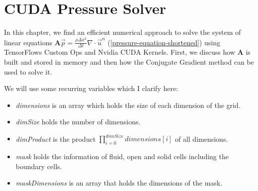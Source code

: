 \chapter{CUDA Pressure Solver}\label{chapter:cudapressuresolver}
In this chapter, we find an efficient numerical approach to solve the system of linear equations $\mathbf{A}\vec{p} = \frac{\rho \Delta x^2}{\Delta t}\nabla \cdot \vec{u}^n$ (\ref{pressure-equation-shortened}) using TensorFlows Custom Ops and Nvidia CUDA Kernels. First, we discuss how \textbf{A} is built and stored in memory and then how the Conjugate Gradient method can be used to solve it. 
\par We will use some recurring variables which I clarify here:
\begin{itemize}
	\setlength\itemsep{-0.3em}
	\item \textit{dimensions} is an array which holds the size of each dimension of the grid.
	\item \textit{dimSize} holds the number of dimensions.
	\item \textit{dimProduct} is the product $\prod_{i=0}^{dimSize} \textit{dimensions}[i]$ of all dimensions. 
	\item \textit{mask} holds the information of fluid, open and solid cells including the boundary cells.
	\item \textit{maskDimensions} is an array that holds the dimensions of the mask.
\end{itemize}

